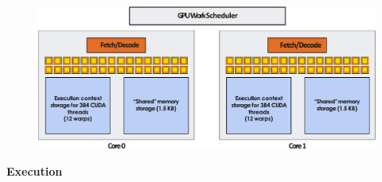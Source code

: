 \begin{figure}[!htp]
    \centering
    \includegraphics[width=\textwidth]{img/cuda-convolve-kernel-1.pdf}
\end{figure}

\newpage

\begin{flushleft}
    \textcolor{Green3}{ \textbf{Execution}}
\end{flushleft}
